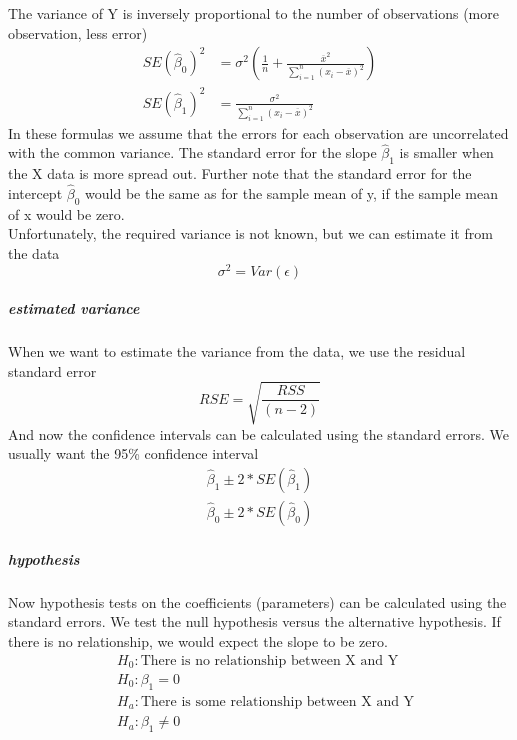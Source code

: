 \documentclass[../document.tex]{subfiles}
\begin{document}
	The variance of Y is inversely proportional to the number of observations (more observation, less error)
	\begin{equation}
	\begin{split}
		SE(\hat{\beta}_{0})^2&=\sigma^2(\frac{1}{n}+\frac{\overline{x}^2}{\sum_{i=1}^{n}(x_{i}-\overline{x})^2})\\
		SE(\hat{\beta}_{1})^2&=\frac{\sigma^2}{\sum_{i=1}^{n}(x_{i}-\overline{x})^2}
	\end{split}
	\end{equation}
	In these formulas we assume that the errors for each observation are uncorrelated with the common variance. The standard error for the slope \(\hat{\beta}_{1}\) is smaller when the X data is more spread out. Further note that the standard error for the intercept \(\hat{\beta}_{0}\) would be the same as for the sample mean of y, if the sample mean of x would be zero.\\
	Unfortunately, the required variance is not known, but we can estimate it from the data
	\begin{equation}
		\sigma^2 = Var(\epsilon)
	\end{equation}
	\subparagraph{estimated variance}
	When we want to estimate the variance from the data, we use the residual standard error
	\begin{equation}
		RSE = \sqrt{\frac{RSS}{(n-2)}}
	\end{equation}
	And now the confidence intervals can be calculated using the standard errors. We usually want the 95\% confidence interval
	\begin{equation}
	\begin{split}
		\hat{\beta}_{1}\pm 2*SE(\hat{\beta}_{1})\\
		\hat{\beta}_{0}\pm 2*SE(\hat{\beta}_{0})
	\end{split}
	\end{equation}
	\subparagraph{hypothesis}
	Now hypothesis tests on the coefficients (parameters) can be calculated using the standard errors. We test the null hypothesis versus the alternative hypothesis. If there is no relationship, we would expect the slope to be zero.
	\begin{equation}
	\begin{split}
		&H_{0}: \text{There is no relationship between X and Y}\\
		&H_{0}: \beta_{1}=0\\
		&H_{a}: \text{There is some relationship between X and Y}\\
		&H_{a}: \beta_{1} \ne 0
	\end{split}
	\end{equation}
\end{document}
